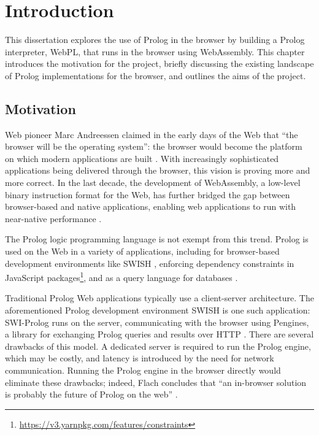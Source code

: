 \chapter{Introduction}

This dissertation explores the use of Prolog in the browser by building a Prolog interpreter, WebPL, that runs in the browser using WebAssembly. This chapter introduces the motivation for the project, briefly discussing the existing landscape of Prolog implementations for the browser, and outlines the aims of the project.

\section{Motivation}

Web pioneer Marc Andreessen claimed in the early days of the Web that ``the browser will be the operating system'': the browser would become the platform on which modern applications are built \cite{kosnerAlwaysEarlyMarc2012}. With increasingly sophisticated applications being delivered through the browser, this vision is proving more and more correct. In the last decade, the development of WebAssembly, a low-level binary instruction format for the Web, has further bridged the gap between browser-based and native applications, enabling web applications to run with near-native performance \cite{haasBringingwebspeed2017}.

The Prolog logic programming language is not exempt from this trend. Prolog is used on the Web in a variety of applications, including for browser-based development environments like SWISH \cite{wielemakerSWISHSWIPrologSharing2015}, enforcing dependency constraints in JavaScript packages\footnote{\url{https://v3.yarnpkg.com/features/constraints}}, and as a query language for databases \cite{wielemakerUsingPrologFundament2007}.

Traditional Prolog Web applications typically use a client-server architecture. The aforementioned Prolog development environment SWISH is one such application: SWI-Prolog runs on the server, communicating with the browser using Pengines, a library for exchanging Prolog queries and results over HTTP \cite{lagerPenginesWebLogic2014}. There are several drawbacks of this model. A dedicated server is required to run the Prolog engine, which may be costly, and latency is introduced by the need for network communication. Running the Prolog engine in the browser directly would eliminate these drawbacks; indeed, Flach concludes that ``an in-browser solution is probably the future of Prolog on the web'' \cite{flachSimplyLogicalFirst2023}.


